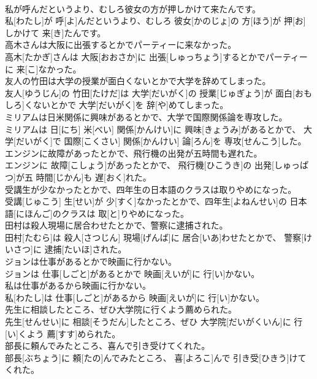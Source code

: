 \documentclass[8pt]{extreport}
\begin{document}
\begin{CJK}{UTF8}{min}
\\	私が呼んだというより、むしろ彼女の方が押しかけて来たんです。	
\\	私[わたし]が 呼[よ]んだというより、むしろ 彼女[かのじょ]の 方[ほう]が 押[お]しかけて 来[き]たんです。
\\	高木さんは大阪に出張するとかでパーティーに来なかった。	
\\	高木[たかぎ]さんは 大阪[おおさか]に 出張[しゅっちょう]するとかでパーティーに 来[こ]なかった。
\\	友人の竹田は大学の授業が面白くないとかで大学を辞めてしまった。	
\\	友人[ゆうじん]の 竹田[たけだ]は 大学[だいがく]の 授業[じゅぎょう]が 面白[おもしろ]くないとかで 大学[だいがく]を 辞[や]めてしまった。
\\	ミリアムは日米関係に興味があるとかで、大学で国際関係論を専攻した。	
\\	ミリアムは 日[にち] 米[べい] 関係[かんけい]に 興味[きょうみ]があるとかで、 大学[だいがく]で 国際[こくさい] 関係[かんけい] 論[ろん]を 専攻[せんこう]した。
\\	エンジンに故障があったとかで、飛行機の出発が五時間も遅れた。	
\\	エンジンに 故障[こしょう]があったとかで、 飛行機[ひこうき]の 出発[しゅっぱつ]が五 時間[じかん]も 遅[おく]れた。
\\	受講生が少なかったとかで、四年生の日本語のクラスは取りやめになった。	
\\	受講[じゅこう] 生[せい]が 少[すく]なかったとかで、四年生[よねんせい]の 日本語[にほんご]のクラスは 取[と]りやめになった。
\\	田村は殺人現場に居合わせたとかで、警察に逮捕された。	
\\	田村[たむら]は 殺人[さつじん] 現場[げんば]に 居合[いあ]わせたとかで、 警察[けいさつ]に 逮捕[たいほ]された。
\\	ジョンは仕事があるとかで映画に行かない。	
\\	ジョンは 仕事[しごと]があるとかで 映画[えいが]に 行[い]かない。
\\	私は仕事があるから映画に行かない。	
\\	私[わたし]は 仕事[しごと]があるから 映画[えいが]に 行[い]かない。
\\	先生に相談したところ、ぜひ大学院に行くよう薦められた。	
\\	先生[せんせい]に 相談[そうだん]したところ、ぜひ 大学院[だいがくいん]に 行[い]くよう 薦[すす]められた。
\\	部長に頼んでみたところ、喜んで引き受けてくれた。	
\\	部長[ぶちょう]に 頼[たの]んでみたところ、 喜[よろこ]んで 引き受[ひきう]けてくれた。

\end{CJK}
\end{document}
